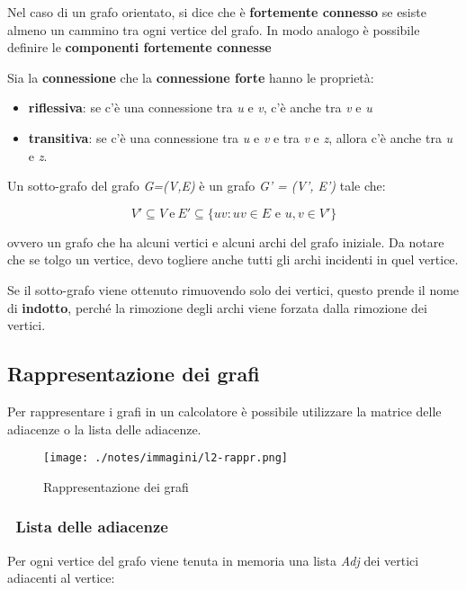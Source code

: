 Nel caso di un grafo orientato, si dice che è \textbf{fortemente
connesso} se esiste almeno un cammino tra ogni vertice del grafo. In
modo analogo è possibile definire le \textbf{componenti fortemente
connesse}

Sia la \textbf{connessione} che la \textbf{connessione forte} hanno le
proprietà:

\begin{itemize}
\item
  \textbf{riflessiva}: se c'è una connessione tra \emph{u} e \emph{v},
  c'è anche tra \emph{v} e \emph{u}
\item
  \textbf{transitiva}: se c'è una connessione tra \emph{u} e \emph{v} e
  tra \emph{v} e \emph{z}, allora c'è anche tra \emph{u} e \emph{z}.
\end{itemize}

Un sotto-grafo del grafo \emph{G=(V,E)} è un grafo \emph{G' = (V', E')}
tale che:

$$
V' \subseteq V \: \text{e} \: E' \subseteq \{ uv : uv \in E \text{ e } u,v \in V' \}
$$

ovvero un grafo che ha alcuni vertici e alcuni archi del grafo iniziale.
Da notare che se tolgo un vertice, devo togliere anche tutti gli archi
incidenti in quel vertice.

Se il sotto-grafo viene ottenuto rimuovendo solo dei vertici, questo
prende il nome di \textbf{indotto}, perché la rimozione degli archi
viene forzata dalla rimozione dei vertici.

\subsection{Rappresentazione dei
grafi}\label{rappresentazione-dei-grafi}

Per rappresentare i grafi in un calcolatore è possibile utilizzare la
matrice delle adiacenze o la lista delle adiacenze.

\begin{figure}[htbp]
\centering
\texttt{[image: ./notes/immagini/l2-rappr.png]}
\caption{Rappresentazione dei grafi}
\end{figure}

\subsubsection{~Lista delle adiacenze}\label{lista-delle-adiacenze}

Per ogni vertice del grafo viene tenuta in memoria una lista \textit{Adj} dei vertici
adiacenti al vertice:

